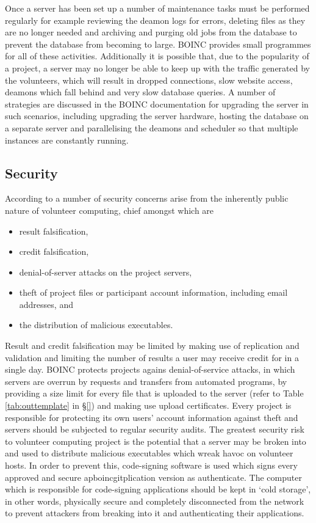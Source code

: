 Once a server has been set up a number of maintenance tasks must be performed regularly for example reviewing the deamon logs for errors, deleting files as they are no longer needed and archiving  and purging old jobs from the database to prevent the database from becoming to large. BOINC provides small programmes for all of these activities. Additionally it is possible that, due to the popularity of a project, a server may no longer be able to keep up with  the traffic generated by the volunteers, which will result in dropped connections, slow website access, deamons which fall behind and very slow database queries. A number of strategies are discussed in the BOINC documentation for upgrading the server in such scenarios, including upgrading the server hardware,  hosting the database on a separate server and  parallelising the deamons and scheduler so that multiple instances are constantly running.

\subsection{Security} \label{Bsecurity}
According to \cite{boincwiki} a number of security concerns arise from the inherently public nature of volunteer computing, chief amongst which are
\begin{itemize}
\item result falsification,
\item credit falsification,
\item denial-of-server attacks on the project servers, 
\item theft of project files or participant account information, including email addresses, and
\item the distribution of malicious executables.
\end{itemize}
Result and credit falsification may be limited by making use of replication and validation and limiting the number of results a user may receive credit for in a single day. 
BOINC protects projects agains denial-of-service attacks, in which servers are overrun by requests and transfers from automated programs, by providing a size limit for every file that is uploaded to the server (refer to Table \ref{tab:outtemplate} in \S \ref{}) and making use upload certificates. Every project is responsible for protecting its own users' account information against theft and servers should be subjected to regular security audits.  
The greatest security risk to volunteer computing project is the potential that a server may be broken into and used to distribute malicious executables which wreak havoc on  volunteer hosts. In order to prevent this, code-signing software is used which signs every approved and secure apboincgitplication version as authenticate. The computer which is responsible for code-signing applications should be kept in `cold storage', in other words, physically secure and completely disconnected from the network to prevent attackers from breaking into it and authenticating their applications. 

